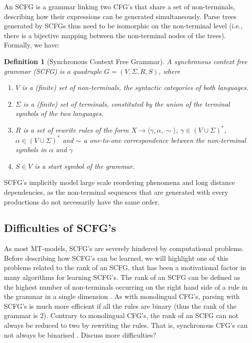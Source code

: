 \documentclass{report}
\theoremstyle{definition}
\theoremstyle{plain}
\newtheorem{definition}{Definition}
\begin{document}
An SCFG \citep{aho1969properties} is a grammar linking two CFG's that share a set of non-terminals, describing how their expressions can be generated simultaneously. Parse trees generated by SCFGs thus need to be isomorphic on the non-terminal level (i.e., there is a bijective mapping between the non-terminal nodes of the trees). Formally, we have:

\begin{definition}[Synchronous Context Free Grammar]
A synchronous context free grammar (SCFG) is a quadruple $G = (V, \Sigma, R, S)$, where\begin{enumerate}
\item $V$ is a (finite) set of non-terminals, the syntactic categories of both languages.
\item $\Sigma$ is a (finite) set of terminals, constituted by the union of the terminal symbols of the two languages.
\item $R$ is a set of rewrite rules of the form $X\rightarrow\langle\gamma,\alpha,\sim\rangle$, $\gamma\in (V\cup\Sigma)^{*}$,  $\alpha\in (V\cup\Sigma)^{*}$ and $\sim$ a one-to-one correspondence between the non-terminal symbols in $\alpha$ and $\gamma$
\item $S\in V$ is a start symbol of the grammar.
\end{enumerate}
\end{definition}

SCFG's implicitly model large scale reordering phenomena and long distance dependencies, as the non-terminal sequences that are generated with every productions do not necessarily have the same order.

\subsection{Difficulties of SCFG's}

As most MT-models, SCFG's are severely hindered by computational problems. Before describing how SCFG's can be learned, we will highlight one of this problems related to the rank of an SCFG, that has been a motivational factor in many algorithms for learning SCFG's. The rank of an SCFG can be defined as the highest number of non-terminals occurring on the right hand side of a rule in the grammar in a single dimension \citep{gildea2006factoring}. As with monolingual CFG's, parsing with SCFG's is much more efficient if all the rules are binary (thus the rank of the grammar is 2). Contrary to monolingual CFG's, the rank of an SCFG can not always be reduced to two by rewriting the rules. That is, synchronous CFG's can not always be binarised \citep{huang2009binarization}. 
Discuss more difficulties?
\end{document}
